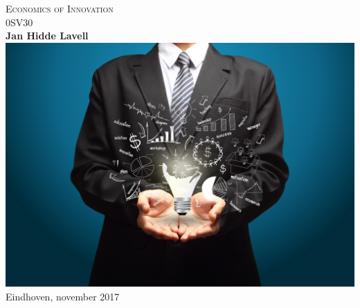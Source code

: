 \documentclass[a4paper,11pt]{report}
\begin{document}
\begin{titlepage}
    \centering
    \vfill
    {\huge
        \textsc{Economics of Innovation}\\
        0SV30\\
        \vskip2cm
        \textbf{Jan Hidde Lavell}\\
    }    
    \vfill
    \includegraphics[width=17cm]{Innovation}  
    \vfill
    Eindhoven, november 2017
    \vfill			

\end{titlepage}

\clearpage

\tableofcontents

\clearpage


\clearpage


\clearpage



\end{document}

